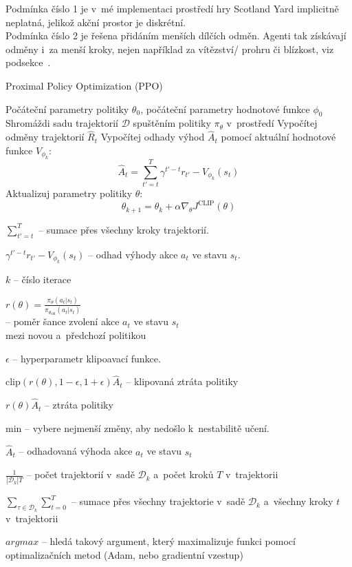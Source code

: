 Podmínka číslo 1 je v~mé implementaci prostředí hry Scotland Yard implicitně neplatná, jelikož akční prostor je diskrétní.\\
Podmínka číslo 2 je řešena přidáním menších dílčích odměn.
Agenti tak získávají odměny i~za menší kroky, nejen například za vítězství/ prohru či blízkost, viz podsekce~.\\

\pagebreak

\begin{algorithm}
  \caption{Proximal Policy Optimization (PPO)}
  \begin{algorithmic}[1]
  \State Počáteční parametry politiky $\theta_0$, počáteční parametry hodnotové funkce $\phi_0$
      \State Shromáždi sadu trajektorií $\mathcal{D}$ spuštěním politiky $\pi_\theta$ v~prostředí
      \State Vypočítej odměny trajektorií $\hat{R}_t$
      \State Vypočítej odhady výhod $\hat{A}_t$ pomocí aktuální hodnotové funkce $V_{\phi_k}$:
      \[
      \hat{A}_t = \sum_{t'=t}^T \gamma^{t'-t} r_{t'} - V_{\phi_k}(s_t)
      \]
      \State Aktualizuj parametry politiky $\theta$:
      \[
        \theta_{k+1} = \theta_k + \alpha \nabla_\theta J^{\text{CLIP}}(\theta)
      \]
    \EndFor
  \end{algorithmic}
  \end{algorithm}
  \begin{myitemize}
    \item $\sum_{t'=t}^T$ -- sumace přes všechny kroky trajektorií.
    \item $\gamma^{t'-t} r_{t'} - V_{\phi_k}(s_t)$ -- odhad výhody akce $a_t$ ve stavu $s_t$.
    \item $k$ -- číslo iterace
    \item $r(\theta) = \frac{\pi_\theta(a_t|s_t)}{\pi_{\theta_{\text{old}}}(a_t|s_t)}$\\ -- poměr šance zvolení akce $a_t$ ve stavu $s_t$ \\ mezi novou a~předchozí politikou
    \item $\epsilon$ -- hyperparametr klipoavací funkce.
    \item $\text{clip}(r(\theta), 1-\epsilon, 1+\epsilon) \hat{A}_t$ -- klipovaná ztráta politiky
    \item $r(\theta) \hat{A}_t$ -- ztráta politiky
    \item min --  vybere nejmenší změny, aby nedošlo k~nestabilitě učení.
    \item $\hat{A}_t$ -- odhadovaná výhoda akce $a_t$ ve stavu $s_t$
    \item $\frac{1}{\left|\mathcal{D}_k\right|T}$ -- počet trajektorií v~sadě $\mathcal{D}_k$ a~počet kroků $T$ v~trajektorii
    \item $\displaystyle\sum_{\tau \in \mathcal{D}_k} \sum_{t=0}^T$ -- sumace přes všechny trajektorie v~sadě $\mathcal{D}_k$ a~všechny kroky $t$ v~trajektorii
    \item $argmax$ -- hledá takový argument, který maximalizuje funkci pomocí optimalizačních metod (Adam, nebo gradientní vzestup)
\end{myitemize}



